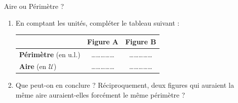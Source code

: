 \documentclass[a4paper]{book}
\begin{document}
\begin{exerciceTitre}{Aire ou Périmètre ?}
    
        \begin{enumerate}
            \item En comptant les unités, compléter le tableau suivant :
            
            \begin{center}
            \renewcommand{\arraystretch}{1.5}
            \begin{tabularx}{0.8\textwidth}{|X|c|c|}
            \hline
             & \textbf{Figure A} & \textbf{Figure B} \\
            \hline
            \textbf{Périmètre} (en u.l.) & \dots\dots\dots\dots\dots & \dots\dots\dots\dots\dots \\
            \hline
            \textbf{Aire} (en $\mathcal{U}$) & \dots\dots\dots\dots\dots & \dots\dots\dots\dots\dots \\
            \hline
            \end{tabularx}
            \end{center}
        
            \item Que peut-on en conclure ? Réciproquement, deux figures qui auraient la même aire auraient-elles forcément le même périmètre ? \newline
        \end{enumerate}
    \end{exerciceTitre}
    
\end{document}
